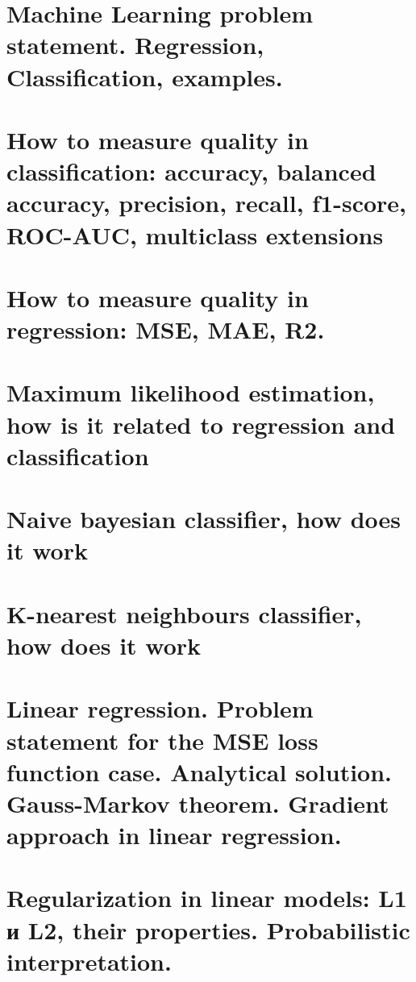 






\section{Machine Learning problem statement. Regression, Classification, examples.}


\section{How to measure quality in classification: accuracy, balanced accuracy, precision, recall, f1-score, ROC-AUC, multiclass extensions}


\section{How to measure quality in regression: MSE, MAE, R2.}


\section{ Maximum likelihood estimation, how is it related to regression and classification}


\section{Naive bayesian classifier, how does it work}


\section{K-nearest neighbours classifier, how does it work}


\section{Linear regression. Problem statement for the MSE loss function case. Analytical solution. Gauss-Markov theorem. Gradient approach in linear regression.}


\section{Regularization in linear models: L1 и L2, their properties. Probabilistic interpretation.}


